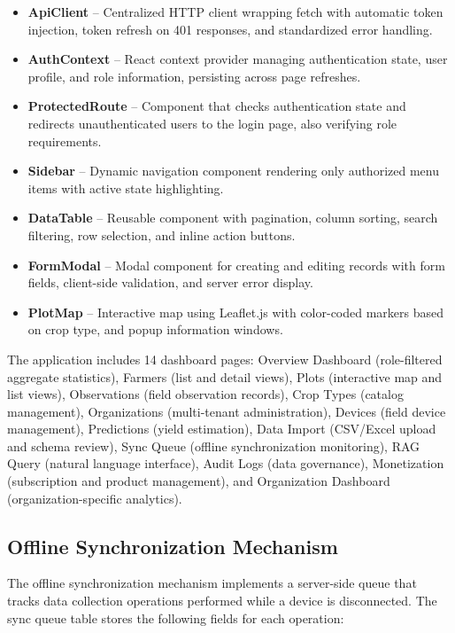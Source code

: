 \documentclass[12pt,a4paper,oneside]{report}
\begin{document}
\begin{itemize}
  \item \textbf{ApiClient} -- Centralized HTTP client wrapping fetch with automatic token injection, token refresh on 401 responses, and standardized error handling.
  \item \textbf{AuthContext} -- React context provider managing authentication state, user profile, and role information, persisting across page refreshes.
  \item \textbf{ProtectedRoute} -- Component that checks authentication state and redirects unauthenticated users to the login page, also verifying role requirements.
  \item \textbf{Sidebar} -- Dynamic navigation component rendering only authorized menu items with active state highlighting.
  \item \textbf{DataTable} -- Reusable component with pagination, column sorting, search filtering, row selection, and inline action buttons.
  \item \textbf{FormModal} -- Modal component for creating and editing records with form fields, client-side validation, and server error display.
  \item \textbf{PlotMap} -- Interactive map using Leaflet.js with color-coded markers based on crop type, and popup information windows.
\end{itemize}

The application includes 14 dashboard pages: Overview Dashboard (role-filtered aggregate statistics), Farmers (list and detail views), Plots (interactive map and list views), Observations (field observation records), Crop Types (catalog management), Organizations (multi-tenant administration), Devices (field device management), Predictions (yield estimation), Data Import (CSV/Excel upload and schema review), Sync Queue (offline synchronization monitoring), RAG Query (natural language interface), Audit Logs (data governance), Monetization (subscription and product management), and Organization Dashboard (organization-specific analytics).

\subsection{Offline Synchronization Mechanism}
The offline synchronization mechanism implements a server-side queue that tracks data collection operations performed while a device is disconnected. The sync queue table stores the following fields for each operation:
\end{document}
